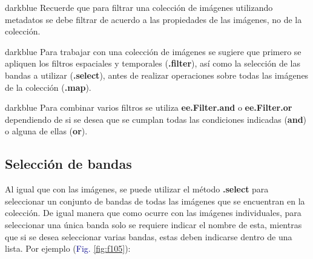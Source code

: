 \documentclass[
  12pt,
  letterpaper,
  twoside]{book}
\newcommand\boldpurple[1]{\textcolor{darkpurple}{\textbf{#1}}}
\begin{document}
\begin{bluebox2}

\begin{awesomeblock}{5pt}{\faLightbulb}{darkblue}
Recuerde que para filtrar una colección de imágenes utilizando metadatos se debe filtrar de acuerdo a las propiedades de las imágenes, no de la colección.

\end{awesomeblock}

\end{bluebox2}

\begin{bluebox2}

\begin{awesomeblock}{5pt}{\faLightbulb}{darkblue}
Para trabajar con una colección de imágenes se sugiere que primero se apliquen los filtros espaciales y temporales (\boldpurple{.filter}), así como la selección de las bandas a utilizar (\boldpurple{.select}), antes de realizar operaciones sobre todas las imágenes de la colección (\boldpurple{.map}).

\end{awesomeblock}

\end{bluebox2}


\begin{bluebox2}

\begin{awesomeblock}{5pt}{\faLightbulb}{darkblue}
Para combinar varios filtros se utiliza \boldpurple{ee.Filter.and} o \boldpurple{ee.Filter.or} dependiendo de si se desea que se cumplan todas las condiciones indicadas (\boldpurple{and}) o alguna de ellas (\boldpurple{or}).

\end{awesomeblock}

\end{bluebox2}

\hypertarget{selecciuxf3n-de-bandas-1}{%
\subsection*{Selección de bandas}\label{selecciuxf3n-de-bandas-1}}

Al igual que con las imágenes, se puede utilizar el método \boldpurple{.select} para seleccionar un conjunto de bandas de todas las imágenes que se encuentran en la colección. De igual manera que como ocurre con las imágenes individuales, para seleccionar una única banda solo se requiere indicar el nombre de esta, mientras que si se desea seleccionar varias bandas, estas deben indicarse dentro de una lista. Por ejemplo (\textcolor{darkblue}{Fig.} \ref{fig:f105}):
\end{document}
